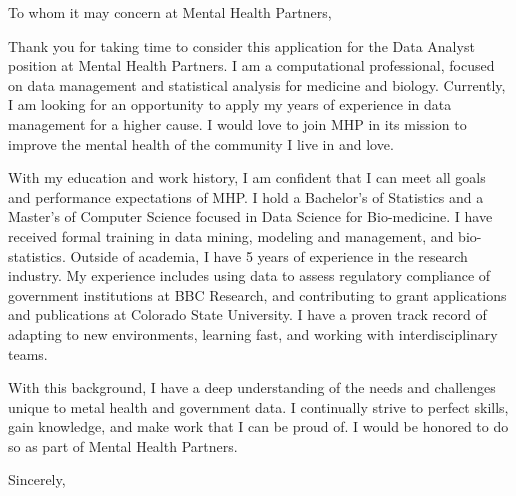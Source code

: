 \documentclass[11pt,twoside]{letter}
\begin{document}
\begin{letter}{}


\newcommand{\jname}
{Data Analyst}
\newcommand{\cname}
{Mental Health Partners}
\newcommand{\cnameshort}
{MHP}

\opening
{To whom it may concern at \cname{},}

\setlength{\parindent}{15pt} %

Thank you for taking time to consider this application for the \jname{} position at \cname{}.
I am a computational professional, focused on data management and statistical analysis for medicine and biology.
%
Currently, I am looking for an opportunity to apply my years of experience in data
management for a higher cause. I would love to join \cnameshort{} in its mission to improve the mental health of the community I live in and love.
%

With my education and work history, I am confident that I can meet all goals and performance expectations of \cnameshort{}.
I hold a Bachelor's of Statistics and a Master's of
{Computer Science focused in Data Science for Bio-medicine}.
I have received formal training in data mining, modeling and management, and bio-statistics.
Outside of academia, I have 5 years of experience in the research industry.
My experience includes using data to assess regulatory compliance of government
institutions at BBC Research, and contributing to grant applications and publications at
Colorado State University.
I have a proven track record of adapting to new environments, learning fast, and
working with interdisciplinary teams.


With this background, I have a deep understanding of the needs and challenges unique to
metal health and government data.
I continually strive to perfect skills, gain knowledge, and make work that I can be proud of.
I would be honored to do so as part of \cname.


\closing{Sincerely,}


\end{letter}
\end{document}
